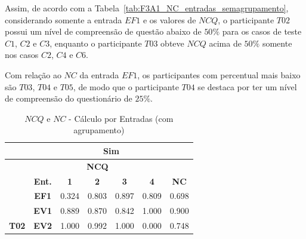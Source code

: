 Assim, de acordo com a Tabela~\ref{tab:F3A1_NC_entradas_semagrupamento}, considerando somente a entrada $EF1$ e os valores de $NCQ$, o participante $T02$ possui um nível de compreensão de questão abaixo de $50\%$ para os casos de teste $C1$, $C2$ e $C3$, enquanto o participante $T03$ obteve $NCQ$ acima de $50\%$ somente nos casos $C2$, $C4$ e $C6$.

Com relação ao $NC$ da entrada $EF1$, os participantes com percentual mais baixo são $T03$, $T04$ e $T05$, de modo que o participante $T04$ se destaca por ter um nível de compreensão do questionário de $25\%$.

\begin{table}[htbp]
	\centering
	\caption{$NCQ$ e $NC$ - Cálculo por Entradas (com agrupamento)}
	\begin{tabular}{|ccccccc|}
		\hline
		\rowcolor[HTML]{D0CECE} 
		\multicolumn{1}{|c|}{\cellcolor[HTML]{F2F2F2}\textbf{Agrupamento}} & \multicolumn{6}{c|}{Sim} \\ \hline
		\rowcolor[HTML]{D0CECE} 
		\multicolumn{1}{|c|}{\cellcolor[HTML]{D0CECE}} & \multicolumn{5}{c|}{\cellcolor[HTML]{D0CECE}\textbf{NCQ}} & \cellcolor[HTML]{D0CECE} \\ \cline{2-6}
		\rowcolor[HTML]{D0CECE} 
		\multicolumn{1}{|c|}{\multirow{-2}{*}{\cellcolor[HTML]{D0CECE}\textbf{Participante}}} & \multicolumn{1}{c|}{\cellcolor[HTML]{D0CECE}\textbf{Ent.}} & \multicolumn{1}{c|}{\cellcolor[HTML]{D0CECE}\textbf{1}} & \multicolumn{1}{c|}{\cellcolor[HTML]{D0CECE}\textbf{2}} & \multicolumn{1}{c|}{\cellcolor[HTML]{D0CECE}\textbf{3}} & \multicolumn{1}{c|}{\cellcolor[HTML]{D0CECE}\textbf{4}} & \multirow{-2}{*}{\cellcolor[HTML]{D0CECE}\textbf{NC}} \\ \hline
		\multicolumn{1}{|c|}{\cellcolor[HTML]{F2F2F2}} & \multicolumn{1}{c|}{\textbf{EF1}} & \multicolumn{1}{c|}{0.324} & \multicolumn{1}{c|}{0.803} & \multicolumn{1}{c|}{0.897} & \multicolumn{1}{c|}{0.809} & 0.698 \\ \cline{2-7} 
		\rowcolor[HTML]{F2F2F2} 
		\multicolumn{1}{|c|}{\cellcolor[HTML]{F2F2F2}} & \multicolumn{1}{c|}{\cellcolor[HTML]{F2F2F2}\textbf{EV1}} & \multicolumn{1}{c|}{\cellcolor[HTML]{F2F2F2}0.889} & \multicolumn{1}{c|}{\cellcolor[HTML]{F2F2F2}0.870} & \multicolumn{1}{c|}{\cellcolor[HTML]{F2F2F2}0.842} & \multicolumn{1}{c|}{\cellcolor[HTML]{F2F2F2}1.000} & 0.900 \\ \cline{2-7} 
		\multicolumn{1}{|c|}{\multirow{-3}{*}{\cellcolor[HTML]{F2F2F2}\textbf{T02}}} & \multicolumn{1}{c|}{\textbf{EV2}} & \multicolumn{1}{c|}{1.000} & \multicolumn{1}{c|}{0.992} & \multicolumn{1}{c|}{1.000} & \multicolumn{1}{c|}{0.000} & 0.748 \\ \hline

\end{tabular}
\end{table}
